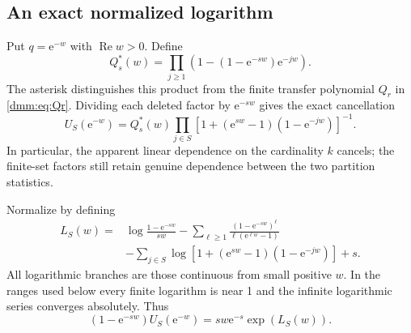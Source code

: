\documentclass[11pt,letterpaper]{article}
\numberwithin{equation}{section}
\theoremstyle{definition}\newtheorem{definition}[theorem]{Definition}
\theoremstyle{remark}\newtheorem{remark}[theorem]{Remark}
\newcommand{\ee}{\mathrm e}
\DeclareMathOperator{\Rea}{Re}
\begin{document}
\subsection{An exact normalized logarithm}
Put $q=\ee^{-w}$ with $\Rea w>0$. Define
\begin{equation}\label{dmm:eq:Qs}
Q_s^*(w)=\prod_{j\ge1}\left(1-(1-\ee^{-sw})\ee^{-jw}\right).
\end{equation}
The asterisk distinguishes this product from the finite transfer polynomial $Q_r$ in \eqref{dmm:eq:Qr}. Dividing each deleted factor by $\ee^{-sw}$ gives the exact cancellation
\begin{equation}\label{dmm:eq:factorU}
U_S(\ee^{-w})=Q_s^*(w)
\prod_{j\in S}\left[1+(\ee^{sw}-1)(1-\ee^{-jw})\right]^{-1}.
\end{equation}
In particular, the apparent linear dependence on the cardinality $k$ cancels; the finite-set factors still retain genuine dependence between the two partition statistics.

Normalize by defining
\begin{align}\label{dmm:eq:LS}
L_S(w)={}&\log\frac{1-\ee^{-sw}}{sw}
-\sum_{\ell\ge1}\frac{(1-\ee^{-sw})^\ell}{\ell(\ee^{\ell w}-1)}\nonumber\\
&-\sum_{j\in S}\log\left[1+(\ee^{sw}-1)(1-\ee^{-jw})\right]+s.
\end{align}
All logarithmic branches are those continuous from small positive $w$. In the ranges used below every finite logarithm is near 1 and the infinite logarithmic series converges absolutely. Thus
\begin{equation}\label{dmm:eq:normalized}
(1-\ee^{-sw})U_S(\ee^{-w})=sw\ee^{-s}\exp(L_S(w)).
\end{equation}
\end{document}
